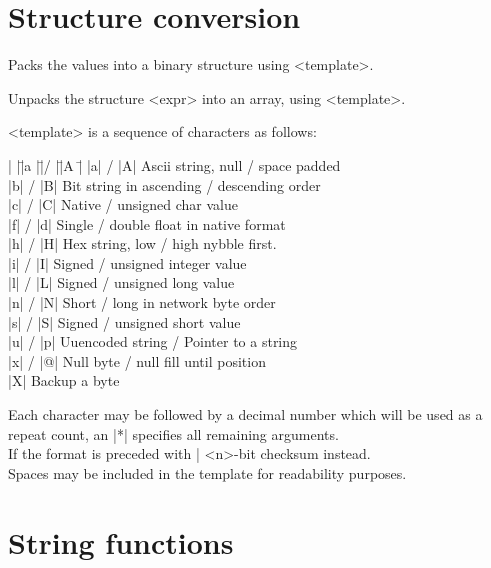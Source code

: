 \section{Structure conversion} 

\begin{enum}{1cm}

Packs the values into a binary structure using <template>.

Unpacks the structure <expr> into an array, using <template>.

<template> is a sequence of characters as follows:

\begin{tabbing}
|  |\=|a |\=|/ |\=|A  |\= \kill
  \> |a| \> / \> |A| \> Ascii string, null / space padded \\
  \> |b| \> / \> |B| \> Bit string in ascending / descending order \\
  \> |c| \> / \> |C| \> Native / unsigned char value \\
  \> |f| \> / \> |d| \> Single / double float in native format \\
  \> |h| \> / \> |H| \> Hex string, low / high nybble first. \\
  \> |i| \> / \> |I| \> Signed / unsigned integer value \\
  \> |l| \> / \> |L| \> Signed / unsigned long value \\
  \> |n| \> / \> |N| \> Short / long in network byte order \\
  \> |s| \> / \> |S| \> Signed / unsigned short value \\
  \> |u| \> / \> |p| \> Uuencoded string / Pointer to a string \\
  \> |x| \> / \> |@| \> Null byte / null fill until position \\
  \> |X| \>   \>     \> Backup a byte
\end{tabbing}

Each character may be followed by a decimal number which will be used
as a repeat count, an |*| specifies all remaining arguments. \\
If the format is preceded with |%
<n>-bit checksum instead. \\
Spaces may be included in the template for readability purposes.

\end{enum}
\section{String functions} 

